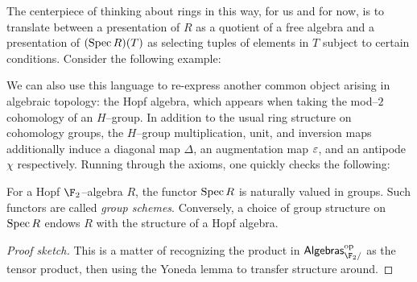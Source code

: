 The centerpiece of thinking about rings in this way, for us and for now, is to translate between a presentation of $R$ as a quotient of a free algebra and a presentation of $(\operatorname{Spec} R)(T)$ as selecting tuples of elements in $T$ subject to certain conditions.  Consider the following example:

We can also use this language to re-express another common object arising in algebraic topology: the Hopf algebra, which appears when taking the mod--$2$ cohomology of an $H$--group.  In addition to the usual ring structure on cohomology groups, the $H$--group multiplication, unit, and inversion maps additionally induce a diagonal map $\Delta$, an augmentation map $\varepsilon$, and an antipode $\chi$ respectively.  Running through the axioms, one quickly checks the following:
\begin{lemma}
For a Hopf $\F_2$--algebra $R$, the functor $\operatorname{Spec} R$ is naturally valued in groups.  Such functors are called \textit{group schemes}.  Conversely, a choice of group structure on $\operatorname{Spec} R$ endows $R$ with the structure of a Hopf algebra.
\end{lemma}
\begin{proof}[Proof sketch]
This is a matter of recognizing the product in $\CatOf{Algebras}_{\F_2/}^{\mathrm{op}}$ as the tensor product, then using the Yoneda lemma to transfer structure around.
\end{proof}

